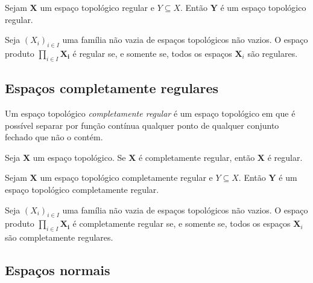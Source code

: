 \begin{proposition}
Sejam $\bm X$ um espaço topológico regular e $Y \subseteq X$. Então $\bm Y$ é um espaço topológico regular.
\end{proposition}

\begin{proposition}
Seja $(X_i)_{i \in I}$ uma família não vazia de espaços topológicos não vazios. O espaço produto $\prod_{i \in I} \bm{X_i}$ é regular se, e somente se, todos os espaços $\bm X_i$ são regulares.
\end{proposition}

\subsection{Espaços completamente regulares}

\begin{definition}
Um espaço topológico \emph{completamente regular} é um espaço topológico
em que é possível separar por função contínua qualquer ponto de qualquer conjunto fechado que não o contém.
\end{definition}

\begin{proposition}
Seja $\bm X$ um espaço topológico. Se $\bm X$ é completamente regular, então $\bm X$ é regular.
\end{proposition}

\begin{proposition}
Sejam $\bm X$ um espaço topológico completamente regular e $Y \subseteq X$. Então $\bm Y$ é um espaço topológico completamente regular.
\end{proposition}

\begin{proposition}
Seja $(X_i)_{i \in I}$ uma família não vazia de espaços topológicos não vazios. O espaço produto $\prod_{i \in I} \bm{X_i}$ é completamente regular se, e somente se, todos os espaços $\bm X_i$ são completamente regulares.
\end{proposition}

\subsection{Espaços normais}

